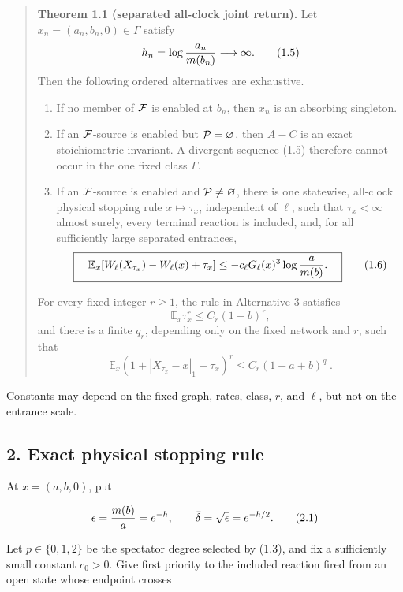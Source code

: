 \begin{quote}
\textbf{Theorem 1.1 (separated all-clock joint return).} Let
\(x_n=(a_n,b_n,0)\in\Gamma\) satisfy \[
       h_n=\log{a_n\over m(b_n)}\longrightarrow\infty.    \tag{1.5}
\] Then the following ordered alternatives are exhaustive.

\begin{enumerate}
\def\labelenumi{\arabic{enumi}.}
\tightlist
\item
  If no member of \({\cal F}\) is enabled at \(b_n\), then \(x_n\) is an
  absorbing singleton.
\item
  If an \({\cal F}\)-source is enabled but \({\cal P}=\varnothing\),
  then \(A-C\) is an exact stoichiometric invariant. A divergent
  sequence (1.5) therefore cannot occur in the one fixed class
  \(\Gamma\).
\item
  If an \({\cal F}\)-source is enabled and \({\cal P}\ne\varnothing\),
  there is one statewise, all-clock physical stopping rule
  \(x\mapsto\tau_x\), independent of \(\ell\), such that
  \(\tau_x<\infty\) almost surely, every terminal reaction is included,
  and, for all sufficiently large separated entrances, \[
  \boxed{\quad
  \mathbb E_x[
    W_\ell(X_{\tau_x})-W_\ell(x)+\tau_x]
     \le-c_\ell G_\ell(x)^3
                  \log{a\over m(b)}.\quad}               \tag{1.6}
  \]
\end{enumerate}

For every fixed integer \(r\ge1\), the rule in Alternative 3 satisfies
\[
      \mathbb E_x\tau_x^r\le C_r(1+b)^r,                  \tag{1.7}
\] and there is a finite \(q_r\), depending only on the fixed network
and \(r\), such that \[
      \mathbb E_x(1+|X_{\tau_x}-x|_1+\tau_x)^r
             \le C_r(1+a+b)^{q_r}.                       \tag{1.8}
\]
\end{quote}

Constants may depend on the fixed graph, rates, class, \(r\), and
\(\ell\), but not on the entrance scale.

\subsection{2. Exact physical stopping
rule}

At \(x=(a,b,0)\), put

\[
 \epsilon={m(b)\over a}=e^{-h},\qquad
 \bar\delta=\sqrt\epsilon=e^{-h/2}.                         \tag{2.1}
\]

Let \(p\in\{0,1,2\}\) be the spectator degree selected by (1.3), and fix
a sufficiently small constant \(c_0>0\). Give first priority to the
included reaction fired from an open state whose endpoint crosses

